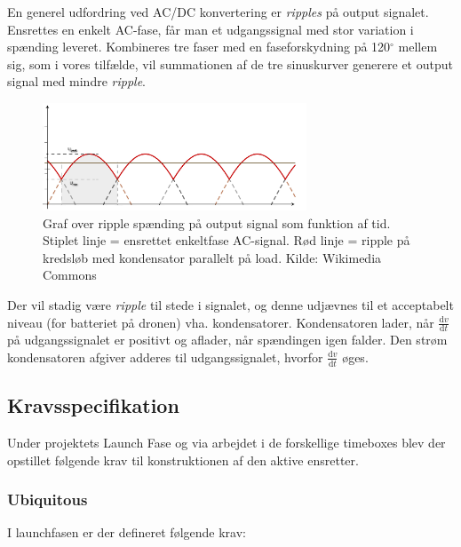 En generel udfordring ved AC/DC konvertering er \textit{ripples} på output signalet. Ensrettes en enkelt AC-fase, får man et udgangssignal med stor variation i spænding leveret. Kombineres tre faser med en faseforskydning på 120$^\circ$ mellem sig, som i vores tilfælde, vil summationen af de tre sinuskurver generere et output signal med mindre \textit{ripple}.

\begin{figure}[h]
  \centering
  \includegraphics[width=0.7\textwidth]{./figurer/prens2.png}
  \caption{Graf over ripple spænding på output signal som funktion af tid. Stiplet linje = ensrettet enkeltfase
AC-signal. Rød linje = ripple på kredsløb med kondensator parallelt på load. Kilde: Wikimedia Commons}
  \label{fig:prens2}
\end{figure}

Der vil stadig være \textit{ripple} til stede i signalet, og denne udjævnes til et acceptabelt niveau (for batteriet på dronen) vha. kondensatorer. Kondensatoren lader, når $\frac{\mathrm{d}v}{\mathrm{d}t}$ på udgangssignalet er positivt og aflader, når spændingen igen falder. Den strøm kondensatoren afgiver adderes til udgangssignalet, hvorfor $\frac{\mathrm{d}v}{\mathrm{d}t}$ øges.

\subsection{Kravsspecifikation}
\label{sec:kravsspecifikation-4}

Under projektets Launch Fase og via arbejdet i de forskellige timeboxes blev der opstillet følgende krav til konstruktionen af den aktive ensretter.

\subsubsection{Ubiquitous}
\label{sec:ubiquitous}

I launchfasen er der defineret følgende krav:\\

